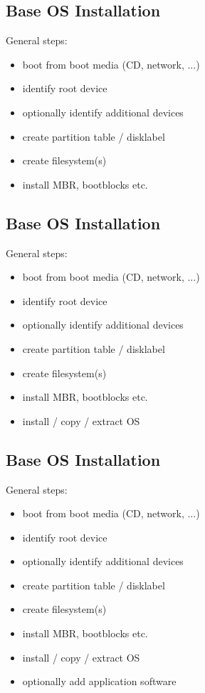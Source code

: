 \documentclass[xga]{xdvislides}
\begin{document}
\subsection{Base OS Installation}
General steps:
\begin{itemize}
	\item boot from boot media (CD, network, ...)
	\item identify root device
	\item optionally identify additional devices
	\item create partition table / disklabel
	\item create filesystem(s)
	\item install MBR, bootblocks etc.
\end{itemize}

\subsection{Base OS Installation}
General steps:
\begin{itemize}
	\item boot from boot media (CD, network, ...)
	\item identify root device
	\item optionally identify additional devices
	\item create partition table / disklabel
	\item create filesystem(s)
	\item install MBR, bootblocks etc.
	\item install / copy / extract OS
\end{itemize}

\subsection{Base OS Installation}
General steps:
\begin{itemize}
	\item boot from boot media (CD, network, ...)
	\item identify root device
	\item optionally identify additional devices
	\item create partition table / disklabel
	\item create filesystem(s)
	\item install MBR, bootblocks etc.
	\item install / copy / extract OS
	\item optionally add application software
\end{itemize}
\end{document}
